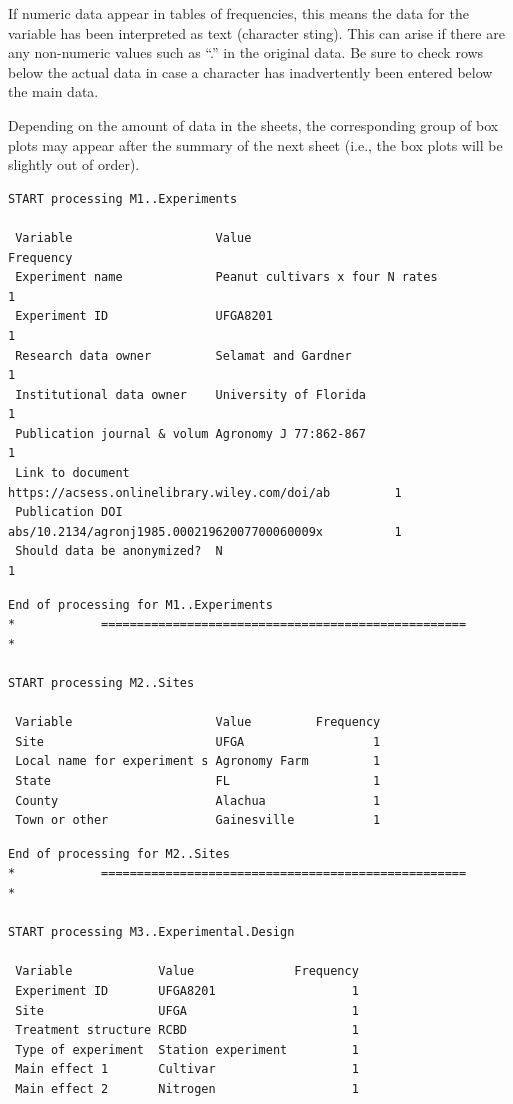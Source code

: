\documentclass[
]{article}
\begin{document}
If numeric data appear in tables of frequencies, this means the data for
the variable has been interpreted as text (character sting). This can
arise if there are any non-numeric values such as ``.'' in the original
data. Be sure to check rows below the actual data in case a character
has inadvertently been entered below the main data.

Depending on the amount of data in the sheets, the corresponding group
of box plots may appear after the summary of the next sheet (i.e., the
box plots will be slightly out of order).

\begin{verbatim}
START processing M1..Experiments

 Variable                    Value                                         Frequency
 Experiment name             Peanut cultivars x four N rates                       1
 Experiment ID               UFGA8201                                              1
 Research data owner         Selamat and Gardner                                   1
 Institutional data owner    University of Florida                                 1
 Publication journal & volum Agronomy J 77:862-867                                 1
 Link to document            https://acsess.onlinelibrary.wiley.com/doi/ab         1
 Publication DOI             abs/10.2134/agronj1985.00021962007700060009x          1
 Should data be anonymized?  N                                                     1
\end{verbatim}

\begin{verbatim}
End of processing for M1..Experiments
*            ===================================================            *

START processing M2..Sites

 Variable                    Value         Frequency
 Site                        UFGA                  1
 Local name for experiment s Agronomy Farm         1
 State                       FL                    1
 County                      Alachua               1
 Town or other               Gainesville           1
\end{verbatim}

\begin{verbatim}
End of processing for M2..Sites
*            ===================================================            *

START processing M3..Experimental.Design

 Variable            Value              Frequency
 Experiment ID       UFGA8201                   1
 Site                UFGA                       1
 Treatment structure RCBD                       1
 Type of experiment  Station experiment         1
 Main effect 1       Cultivar                   1
 Main effect 2       Nitrogen                   1
\end{verbatim}
\end{document}
